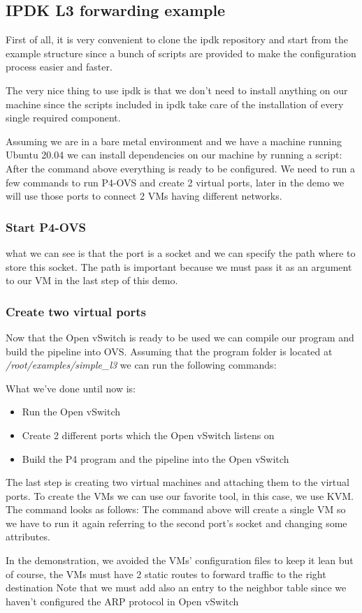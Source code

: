 \documentclass[../sn.tex]{subfiles}
\begin{document}
\subsection{IPDK L3 forwarding example}
First of all, it is very convenient to clone the \acrshort{ipdk} repository and start from the example structure since a bunch of scripts are provided to make the configuration process easier and faster.

The very nice thing to use \acrshort{ipdk} is that we don't need to install anything on our machine since the scripts included in \acrshort{ipdk} take care of the installation of every single required component.

Assuming we are in a bare metal environment and we have a machine running Ubuntu 20.04 we can install dependencies on our machine by running a script:
After the command above everything is ready to be configured.
We need to run a few commands to run P4-OVS and create 2 virtual ports, later in the demo we will use those ports to connect 2 VMs having different networks.
\subsubsection*{Start P4-OVS}
what we can see is that the port is a socket and we can specify the path where to store this socket.
The path is important because we must pass it as an argument to our VM in the last step of this demo.
\subsubsection*{Create two virtual ports}
Now that the Open vSwitch is ready to be used we can compile our program and build the pipeline into OVS.
Assuming that the program folder is located at \emph{/root/examples/simple\_l3} we can run the following commands:

What we've done until now is: 
\begin{itemize}
    \item Run the Open vSwitch
    \item Create 2 different ports which the Open vSwitch listens on
    \item Build the P4 program and the pipeline into the Open vSwitch
\end{itemize}
The last step is creating two virtual machines and attaching them to the virtual ports.
To create the VMs we can use our favorite tool, in this case, we use KVM.
The command looks as follows:
The command above will create a single VM so we have to run it again referring to the second port's socket and changing some attributes.

In the demonstration, we avoided the VMs' configuration files to keep it lean but of course, the VMs must have 2 static routes to forward traffic to the right destination
Note that we must add also an entry to the neighbor table since we haven't configured the ARP protocol in Open vSwitch
\clearpage
\end{document}
